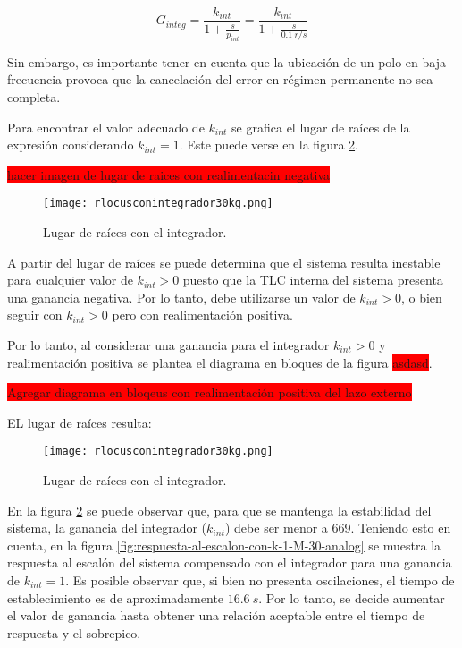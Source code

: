 \begin{equation}
	G_{integ}=\frac{k_{int}}{1+\frac{s}{p_{int}}}=\frac{k_{int}}{1+\frac{s}{0.1\:r/s}}	
\end{equation}

Sin embargo, es importante tener en cuenta que la ubicación de un polo en baja frecuencia provoca que la cancelación del error en régimen permanente no sea completa.


Para encontrar el valor adecuado de $k_{int}$ se grafica el lugar de raíces de la expresión \label{eq_cadena_avance_integrador} considerando $k_{int}=1$. Este puede verse en la figura \ref{fig:lugar-de-raices-con-integrador-analog}.

\colorbox{red}{hacer imagen de lugar de raices con realimentacin negativa}

\begin{figure}[H]
	\centering
	\texttt{[image: rlocusconintegrador30kg.png]}
	\caption{Lugar de raíces con el integrador.}
	\label{fig:lugar-de-raices-con-integrador-analog}
\end{figure}

A partir del lugar de raíces se puede determina que el sistema resulta inestable para cualquier valor de $k_{int}>0$ puesto que la TLC interna del sistema presenta una ganancia negativa. Por lo tanto, debe utilizarse un valor de $k_{int}>0$, o bien seguir con $k_{int}>0$ pero con realimentación positiva. 

Por lo tanto, al considerar una ganancia para el integrador $k_{int}>0$ y realimentación positiva se plantea el diagrama en bloques de la figura \colorbox{red}{asdasd}.

\colorbox{red}{Agregar diagrama en bloqeus con realimentación positiva del lazo externo}

EL lugar de raíces resulta:

\begin{figure}[H]
	\centering
	\texttt{[image: rlocusconintegrador30kg.png]}
	\caption{Lugar de raíces con el integrador.}
	\label{fig:lugar-de-raices-con-integrador-analog}
\end{figure}
 
\noindent En la figura \ref{fig:lugar-de-raices-con-integrador-analog} se puede observar que, para que se mantenga la estabilidad del sistema, la ganancia del integrador ($k_{int}$) debe ser menor a 669. Teniendo esto en cuenta, en la figura \ref{fig:respuesta-al-escalon-con-k-1-M-30-analog} se muestra la respuesta al escalón del sistema compensado con el integrador para una ganancia de $k_{int}=1$. Es posible observar que, si bien no presenta oscilaciones, el tiempo de establecimiento es de aproximadamente $16.6 \:s$. Por lo tanto, se decide aumentar el valor de ganancia hasta obtener una relación aceptable entre el tiempo de respuesta y el sobrepico.

